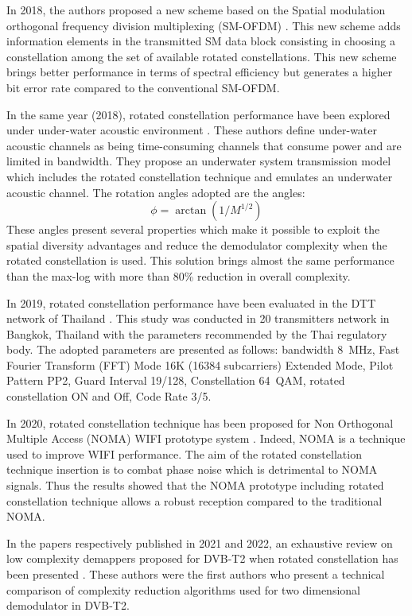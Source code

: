 In 2018, the authors proposed a new scheme based on the Spatial modulation orthogonal frequency division multiplexing (SM-OFDM) \cite{ref10}. This new scheme adds information elements in the transmitted SM data block consisting in choosing a constellation among the set of available rotated constellations. This new scheme brings better performance in terms of spectral efficiency but generates a higher bit error rate compared to the conventional SM-OFDM.

In the same year (2018), rotated constellation performance have been explored under under-water acoustic environment \cite{ref11}. These authors define under-water acoustic channels as being time-consuming channels that consume power and are limited in bandwidth. They propose an underwater system transmission model which includes the rotated constellation technique and emulates an underwater acoustic channel. The rotation angles adopted are the angles:
\begin{equation}
\phi = \arctan\left(1/M^{1/2}\right)
\end{equation}
These angles present several properties which make it possible to exploit the spatial diversity advantages and reduce the demodulator complexity when the rotated constellation is used. This solution brings almost the same performance than the max-log with more than 80\% reduction in overall complexity.

In 2019, rotated constellation performance have been evaluated in the DTT network of Thailand \cite{ref12}. This study was conducted in 20 transmitters network in Bangkok, Thailand with the parameters recommended by the Thai regulatory body. The adopted parameters are presented as follows: bandwidth 8~MHz, Fast Fourier Transform (FFT) Mode 16K (16384 subcarriers) Extended Mode, Pilot Pattern PP2, Guard Interval 19/128, Constellation 64~QAM, rotated constellation ON and Off, Code Rate 3/5.

In 2020, rotated constellation technique has been proposed for Non Orthogonal Multiple Access (NOMA) WIFI prototype system \cite{ref13}. Indeed, NOMA is a technique used to improve WIFI performance. The aim of the rotated constellation technique insertion is to combat phase noise which is detrimental to NOMA signals. Thus the results showed that the NOMA prototype including rotated constellation technique allows a robust reception compared to the traditional NOMA.

In the papers respectively published in 2021 and 2022, an exhaustive review on low complexity demappers proposed for DVB-T2 when rotated constellation has been presented \cite{ref14,ref15}. These authors were the first authors who present a technical comparison of complexity reduction algorithms used for two dimensional demodulator in DVB-T2.

